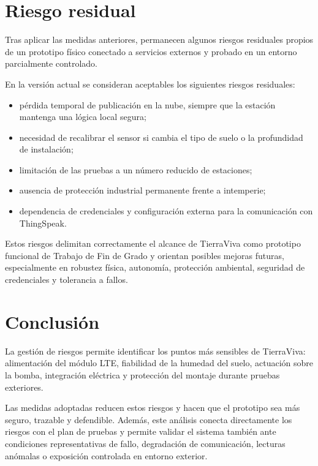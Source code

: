 \section{Riesgo residual}

Tras aplicar las medidas anteriores, permanecen algunos riesgos residuales propios de un prototipo físico conectado a servicios externos y probado en un entorno parcialmente controlado.

En la versión actual se consideran aceptables los siguientes riesgos residuales:

\begin{itemize}
    \item pérdida temporal de publicación en la nube, siempre que la estación mantenga una lógica local segura;
    \item necesidad de recalibrar el sensor si cambia el tipo de suelo o la profundidad de instalación;
    \item limitación de las pruebas a un número reducido de estaciones;
    \item ausencia de protección industrial permanente frente a intemperie;
    \item dependencia de credenciales y configuración externa para la comunicación con ThingSpeak.
\end{itemize}

Estos riesgos delimitan correctamente el alcance de TierraViva como prototipo funcional de Trabajo de Fin de Grado y orientan posibles mejoras futuras, especialmente en robustez física, autonomía, protección ambiental, seguridad de credenciales y tolerancia a fallos.

\section{Conclusión}

La gestión de riesgos permite identificar los puntos más sensibles de TierraViva: alimentación del módulo LTE, fiabilidad de la humedad del suelo, actuación sobre la bomba, integración eléctrica y protección del montaje durante pruebas exteriores.

Las medidas adoptadas reducen estos riesgos y hacen que el prototipo sea más seguro, trazable y defendible. Además, este análisis conecta directamente los riesgos con el plan de pruebas y permite validar el sistema también ante condiciones representativas de fallo, degradación de comunicación, lecturas anómalas o exposición controlada en entorno exterior.